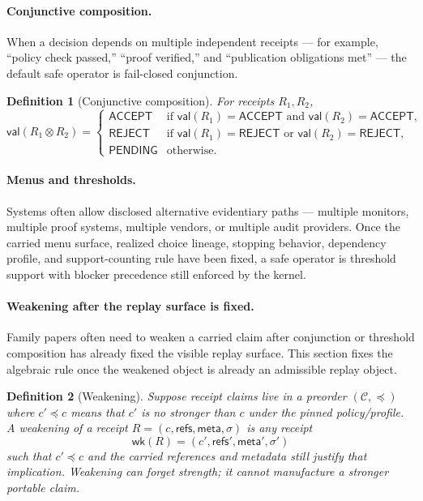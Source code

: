 \documentclass[11pt]{article}
\newtheorem{definition}{Definition}
\theoremstyle{remark}
\newcommand{\Acc}{\mathsf{ACCEPT}}
\newcommand{\Rej}{\mathsf{REJECT}}
\newcommand{\Pend}{\mathsf{PENDING}}
\newcommand{\Combine}{\mathbin{\otimes}}
\begin{document}
\paragraph{Conjunctive composition.}
When a decision depends on multiple independent receipts --- for example, ``policy check passed,'' ``proof verified,'' and ``publication obligations met'' ---
the default safe operator is fail-closed conjunction.

\begin{definition}[Conjunctive composition]
For receipts $R_1,R_2$,
\[
\mathsf{val}(R_1 \Combine R_2)=
\begin{cases}
\Acc & \text{if }\mathsf{val}(R_1)=\Acc \text{ and } \mathsf{val}(R_2)=\Acc,\\
\Rej & \text{if }\mathsf{val}(R_1)=\Rej \text{ or } \mathsf{val}(R_2)=\Rej,\\
\Pend & \text{otherwise.}
\end{cases}
\]
\end{definition}

\paragraph{Menus and thresholds.}
Systems often allow disclosed alternative evidentiary paths --- multiple monitors, multiple proof systems, multiple vendors, or multiple audit providers.
Once the carried menu surface, realized choice lineage, stopping behavior, dependency profile, and support-counting rule have been fixed,
a safe operator is threshold support with blocker precedence still enforced by the kernel.

\paragraph{Weakening after the replay surface is fixed.}
Family papers often need to weaken a carried claim after conjunction or threshold composition has already fixed the visible replay surface.
This section fixes the algebraic rule once the weakened object is already an admissible replay object.

\begin{definition}[Weakening]
Suppose receipt claims live in a preorder $(\mathcal{C},\preceq)$ where $c'\preceq c$ means that $c'$ is no stronger than $c$
under the pinned policy/profile.
A weakening of a receipt $R=(c,\mathsf{refs},\mathsf{meta},\sigma)$ is any receipt
\[
\mathsf{wk}(R)=(c',\mathsf{refs}',\mathsf{meta}',\sigma')
\]
such that $c'\preceq c$ and the carried references and metadata still justify that implication.
Weakening can forget strength; it cannot manufacture a stronger portable claim.
\end{definition}
\end{document}
